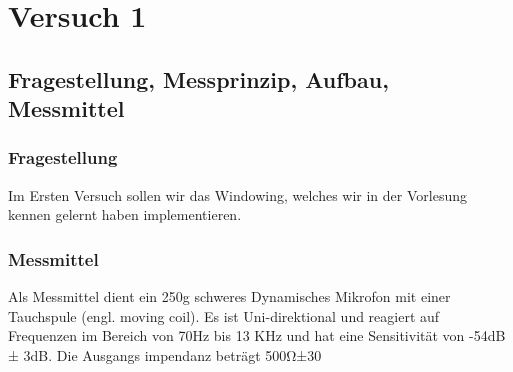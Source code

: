 \documentclass[TGAI_Laborbericht.tex]{subfiles}
\begin{document}
\chapter{Versuch 1}
\label{chap:VERSUCH_1}


\section{Fragestellung, Messprinzip, Aufbau, Messmittel}
\label{chap:VERSUCH_1_FRAGESTELLUNG}
\subsection{Fragestellung}
Im Ersten Versuch sollen wir das Windowing, welches wir in der Vorlesung kennen gelernt haben implementieren.


\subsection{Messmittel}
Als Messmittel dient ein 250g schweres Dynamisches Mikrofon mit einer Tauchspule (engl.
moving coil). Es ist Uni-direktional und reagiert auf Frequenzen im Bereich von 70Hz
bis 13 KHz und hat eine Sensitivität von -54dB ± 3dB. Die Ausgangs impendanz beträgt
500Ω±30%
\end{document}
